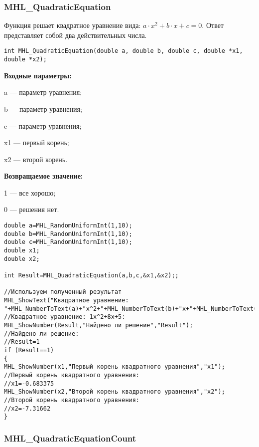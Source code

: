 \documentclass[a4paper,12pt]{article}
\begin{document}
\subsubsection{MHL\_QuadraticEquation}\label{MHL_QuadraticEquation}

Функция решает квадратное уравнение вида: $a\cdot x^2+b\cdot x+c=0$. Ответ представляет собой два действительных числа.


\begin{lstlisting}[label=code_syntax_MHL_QuadraticEquation,caption=Синтаксис]
int MHL_QuadraticEquation(double a, double b, double c, double *x1, double *x2);
\end{lstlisting}

\textbf{Входные параметры:}
 
a --- параметр уравнения;
 
b --- параметр уравнения;
 
c --- параметр уравнения;
 
x1 --- первый корень;
 
x2 --- второй корень.

\textbf{Возвращаемое значение:}
 
1 --- все хорошо;
 
0 --- решения нет.



\begin{lstlisting}[label=code_use_MHL_QuadraticEquation,caption=Пример использования]
double a=MHL_RandomUniformInt(1,10);
double b=MHL_RandomUniformInt(1,10);
double c=MHL_RandomUniformInt(1,10);
double x1;
double x2;

int Result=MHL_QuadraticEquation(a,b,c,&x1,&x2);;

//Используем полученный результат
MHL_ShowText("Квадратное уравнение: "+MHL_NumberToText(a)+"x^2+"+MHL_NumberToText(b)+"x+"+MHL_NumberToText(c)+"=0");
//Квадратное уравнение: 1x^2+8x+5:
MHL_ShowNumber(Result,"Найдено ли решение","Result");
//Найдено ли решение:
//Result=1
if (Result==1)
{
MHL_ShowNumber(x1,"Первый корень квадратного уравнения","x1");
//Первый корень квадратного уравнения:
//x1=-0.683375
MHL_ShowNumber(x2,"Второй корень квадратного уравнения","x2");
//Второй корень квадратного уравнения:
//x2=-7.31662
}
\end{lstlisting}

\subsubsection{MHL\_QuadraticEquationCount}\label{MHL_QuadraticEquationCount}
\end{document}
